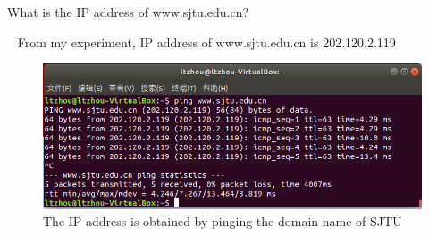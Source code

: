 \begin{exercise}[]{What is the IP address of www.sjtu.edu.cn? }
  \begin{solution}
  \par{~} From my experiment, IP address of www.sjtu.edu.cn is 202.120.2.119

  \begin{figure}[h]
    \begin{center}
    \includegraphics[width=12cm]{img/lab1/ex2}
    \caption{The IP address is obtained by pinging the domain name of SJTU}
    \label{fig:ex2}
    \end{center}
  \end{figure}
  \end{solution}
  \label{ex2}
\end{exercise}

\newpage

